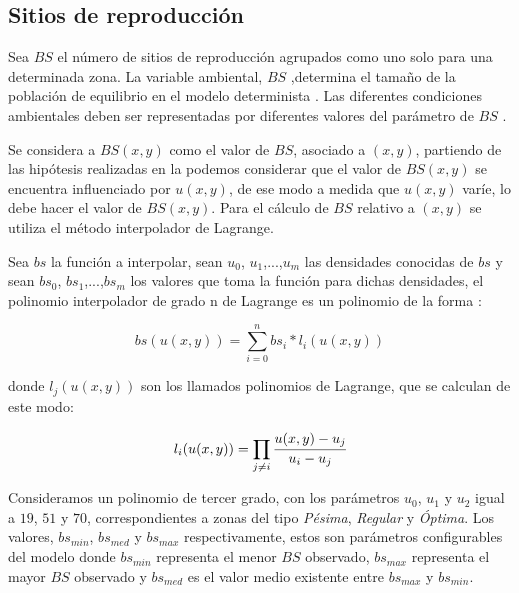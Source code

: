 \subsection{Sitios de reproducción}
\label{subsec:cap4-sitios de reproduccion}
Sea $BS$ el número de sitios de reproducción agrupados como uno solo para una determinada zona. La
variable ambiental, $BS$ ,determina el tamaño de la población de equilibrio en el modelo
determinista \cite{otero2006stochastic}. Las diferentes condiciones ambientales deben ser
representadas por diferentes valores del parámetro de $BS$ \cite{otero2006stochastic}.

Se considera a $BS(x,y)$ como el valor de $BS$, asociado a $(x,y)$, partiendo de las hipótesis
realizadas en la  podemos considerar que el valor de $BS(x,y)$ se
encuentra influenciado por $u(x,y)$, de ese modo a medida que $u(x,y)$ varíe, lo debe hacer el
valor de $BS(x,y)$. Para el cálculo de $BS$ relativo a $(x,y)$ se utiliza el método interpolador
de Lagrange.

Sea $bs$ la función a interpolar, sean $u_0$, $u_1$,...,$u_m$ las densidades conocidas de $bs$ y
sean $bs_0$, $bs_1$,...,$bs_m$ los valores que toma la función para dichas densidades, el polinomio interpolador de grado n de Lagrange es un polinomio de la forma :

\begin{equation}
\label{eq:sitios-reproduccion-x-y}
    bs(u(x,y)) = \sum_{i=0}^{n} bs_{i} * l_{i}(u(x,y))
\end{equation}

donde $l_j(u(x,y))$ son los llamados polinomios de Lagrange, que se calculan de este modo:

\begin{equation}
\label{eq:sitios-reproduccion-x-y}
    l_{i}(u(x,y)) = \prod_{j \neq i} \cfrac{u(x,y) - u_{j}}{u_{i} - u_{j}}
\end{equation}

Consideramos un polinomio de tercer grado, con los parámetros $u_0$, $u_1$ y $u_2$ igual a $19$,
$51$ y $70$, correspondientes a zonas del tipo \textit{Pésima}, \textit{Regular} y \textit{Óptima}.
Los valores, $bs_{min}$, $bs_{med}$ y $bs_{max}$ respectivamente, estos son parámetros
configurables del modelo donde $bs_{min}$ representa el menor $BS$ observado, $bs_{max}$
representa el mayor $BS$ observado y  $bs_{med}$ es el valor medio existente entre $bs_{max}$ y
$bs_{min}$.
